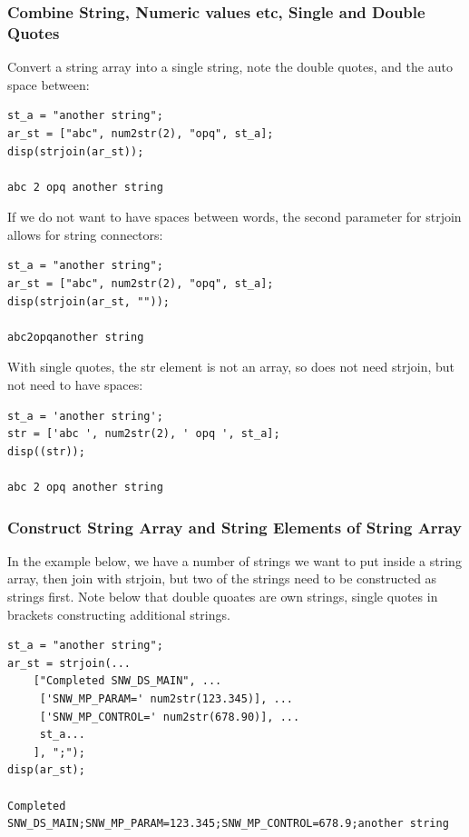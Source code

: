 \documentclass[
]{book}
\begin{document}
\hypertarget{combine-string-numeric-values-etc-single-and-double-quotes}{%
\subsubsection{Combine String, Numeric values etc, Single and Double Quotes}\label{combine-string-numeric-values-etc-single-and-double-quotes}}

Convert a string array into a single string, note the double quotes, and
the auto space between:

\begin{verbatim}
st_a = "another string";
ar_st = ["abc", num2str(2), "opq", st_a];
disp(strjoin(ar_st));

abc 2 opq another string
\end{verbatim}

If we do not want to have spaces between words, the second parameter for
strjoin allows for string connectors:

\begin{verbatim}
st_a = "another string";
ar_st = ["abc", num2str(2), "opq", st_a];
disp(strjoin(ar_st, ""));

abc2opqanother string
\end{verbatim}

With single quotes, the str element is not an array, so does not need
strjoin, but not need to have spaces:

\begin{verbatim}
st_a = 'another string';
str = ['abc ', num2str(2), ' opq ', st_a];
disp((str));

abc 2 opq another string
\end{verbatim}

\hypertarget{construct-string-array-and-string-elements-of-string-array}{%
\subsubsection{Construct String Array and String Elements of String Array}\label{construct-string-array-and-string-elements-of-string-array}}

In the example below, we have a number of strings we want to put inside
a string array, then join with strjoin, but two of the strings need to
be constructed as strings first. Note below that double quoates are own
strings, single quotes in brackets constructing additional strings.

\begin{verbatim}
st_a = "another string";
ar_st = strjoin(...
    ["Completed SNW_DS_MAIN", ...
     ['SNW_MP_PARAM=' num2str(123.345)], ...
     ['SNW_MP_CONTROL=' num2str(678.90)], ...
     st_a...
    ], ";");
disp(ar_st);

Completed SNW_DS_MAIN;SNW_MP_PARAM=123.345;SNW_MP_CONTROL=678.9;another string
\end{verbatim}
\end{document}
